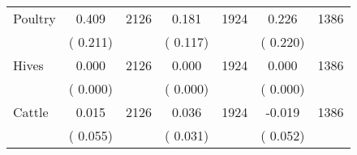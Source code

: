 \begin{tabular}{l*{6}{c}}
Poultry        &              0.409      &       2126       &              0.181      &       1924       &              0.226      &       1386       \\
                       &       (       0.211)            &                               &       (       0.117)            &                               &       (       0.220)            &                               \\
Hives        &              0.000      &       2126       &              0.000      &       1924       &              0.000      &       1386       \\
                       &       (       0.000)            &                               &       (       0.000)            &                               &       (       0.000)            &                               \\
Cattle        &              0.015      &       2126       &              0.036      &       1924       &             -0.019      &       1386       \\
                       &       (       0.055)            &                               &       (       0.031)            &                               &       (       0.052)            &                               \\
\hline \end{tabular}
